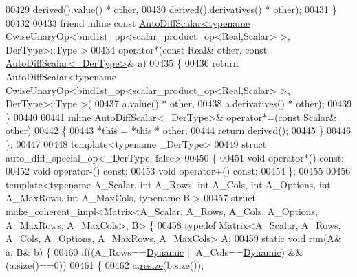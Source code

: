 \begin{DoxyCode}
00429       derived().value() * other,
00430       derived().derivatives() * other);
00431   \}
00432 
00433   \textcolor{keyword}{friend} \textcolor{keyword}{inline} \textcolor{keyword}{const} 
      \hyperlink{class_eigen_1_1_auto_diff_scalar}{AutoDiffScalar<typename CwiseUnaryOp<bind1st\_op<scalar\_product\_op<Real,Scalar>}
       >, DerType>::Type >
00434   operator*(\textcolor{keyword}{const} Real& other, \textcolor{keyword}{const} \hyperlink{class_eigen_1_1_auto_diff_scalar}{AutoDiffScalar<\_DerType>}& a)
00435   \{
00436     \textcolor{keywordflow}{return} AutoDiffScalar<typename CwiseUnaryOp<bind1st\_op<scalar\_product\_op<Real,Scalar> >, DerType>::Type
       >(
00437       a.value() * other,
00438       a.derivatives() * other);
00439   \}
00440 
00441   \textcolor{keyword}{inline} \hyperlink{class_eigen_1_1_auto_diff_scalar}{AutoDiffScalar<\_DerType>}& operator*=(\textcolor{keyword}{const} Scalar& other)
00442   \{
00443     *\textcolor{keyword}{this} = *\textcolor{keyword}{this} * other;
00444     \textcolor{keywordflow}{return} derived();
00445   \}
00446 \};
00447 
00448 \textcolor{keyword}{template}<\textcolor{keyword}{typename} \_DerType>
00449 \textcolor{keyword}{struct }auto\_diff\_special\_op<\_DerType, false>
00450 \{
00451   \textcolor{keywordtype}{void} operator*() \textcolor{keyword}{const};
00452   \textcolor{keywordtype}{void} operator-() \textcolor{keyword}{const};
00453   \textcolor{keywordtype}{void} operator+() \textcolor{keyword}{const};
00454 \};
00455 
00456 \textcolor{keyword}{template}<\textcolor{keyword}{typename} A\_Scalar, \textcolor{keywordtype}{int} A\_Rows, \textcolor{keywordtype}{int} A\_Cols, \textcolor{keywordtype}{int} A\_Options, \textcolor{keywordtype}{int} A\_MaxRows, \textcolor{keywordtype}{int} A\_MaxCols, \textcolor{keyword}{typename} B
      >
00457 \textcolor{keyword}{struct }make\_coherent\_impl<Matrix<A\_Scalar, A\_Rows, A\_Cols, A\_Options, A\_MaxRows, A\_MaxCols>, B> \{
00458   \textcolor{keyword}{typedef} \hyperlink{group___core___module_class_eigen_1_1_matrix}{Matrix<A\_Scalar, A\_Rows, A\_Cols, A\_Options, A\_MaxRows, A\_MaxCols>}
       \hyperlink{group___core___module_class_eigen_1_1_matrix}{A};
00459   \textcolor{keyword}{static} \textcolor{keywordtype}{void} run(A& a, B& b) \{
00460     \textcolor{keywordflow}{if}((A\_Rows==\hyperlink{namespace_eigen_ad81fa7195215a0ce30017dfac309f0b2}{Dynamic} || A\_Cols==\hyperlink{namespace_eigen_ad81fa7195215a0ce30017dfac309f0b2}{Dynamic}) && (a.size()==0))
00461     \{
00462       a.\hyperlink{class_eigen_1_1_plain_object_base_a99d9054ee2d5a40c6e00ded0265e9cea}{resize}(b.size());

\end{DoxyCode}
